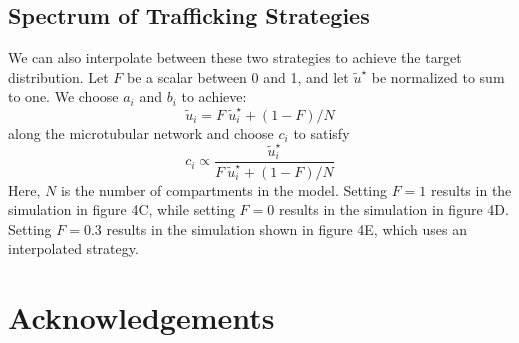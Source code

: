 \documentclass[fleqn,10pt]{wlpeerj}
\begin{document}
\subsection*{Spectrum of Trafficking Strategies}

We can also interpolate between these two strategies to achieve the target distribution. Let $F$ be a scalar between 0 and 1, and let $\tilde{u}^\star$ be normalized to sum to one. We choose $a_i$ and $b_i$ to achieve:
$$
\tilde{u}_i = F~\tilde{u}_i^\star + (1-F)/N 
$$
along the microtubular network and choose $c_i$ to satisfy
$$
c_i \propto \frac{\tilde{u}_i^\star}{F~\tilde{u}_i^\star + (1-F)/N} 
$$
Here, $N$ is the number of compartments in the model. Setting $F=1$ results in the simulation in figure 4C, while setting $F=0$ results in the simulation in figure 4D. Setting $F=0.3$ results in the simulation shown in figure 4E, which uses an interpolated strategy.


\section*{Acknowledgements}


\end{document}
